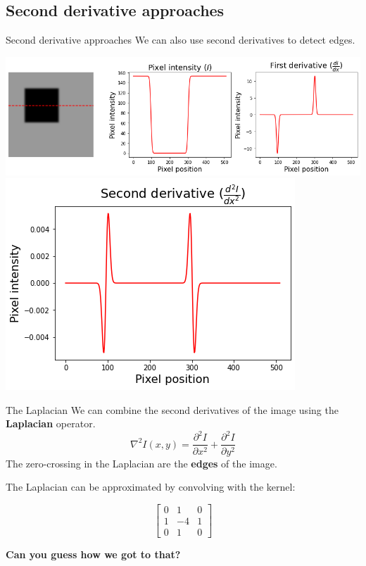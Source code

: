 \documentclass[9pt, aspectratio=169]{beamer}
\begin{document}


\subsection{Second derivative approaches}

\begin{frame}
    {Second derivative approaches}
    We can also use second derivatives to detect edges.

    \centering
    \includegraphics[width=.7\textwidth]{intensity_derivative.png}
    \pause
    \centering
    \includegraphics[width=.3\textwidth]{intensity_second_derivative.png}
\end{frame}

\begin{frame}
    {The Laplacian}
    We can combine the second derivatives of the image using the \textbf{Laplacian} operator.
    \Large{
    $$\nabla^2 I(x,y) = \frac{\partial^2{I}}{\partial{x^2}}+ \frac{\partial^2{I}}{\partial{y^2}}$$
    }
    \normalsize
    The zero-crossing in the Laplacian are the \textbf{edges} of the image.

    The Laplacian can be approximated by convolving with the kernel:

    $$\begin{bmatrix}
            0 & 1  & 0 \\
            1 & -4 & 1 \\
            0 & 1  & 0
        \end{bmatrix}$$

    \textbf{Can you guess how we got to that?}
\end{frame}
\end{document}
